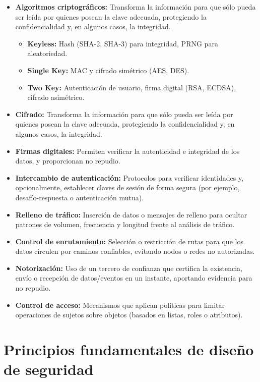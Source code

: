 \documentclass[11pt,a4paper]{article}
\begin{document}
    \begin{itemize}
        \item \textbf{Algoritmos criptográficos:} Transforma la información para que sólo pueda ser leída por quienes posean la clave adecuada, protegiendo la confidencialidad y, en algunos casos, la integridad.
        \begin{itemize}
            \item \textbf{Keyless:} Hash (SHA-2, SHA-3) para integridad, PRNG para aleatoriedad.
            \item \textbf{Single Key:} MAC y cifrado simétrico (AES, DES).
            \item \textbf{Two Key:} Autenticación de usuario, firma digital (RSA, ECDSA), cifrado asimétrico.
        \end{itemize}

        \item \textbf{Cifrado:} Transforma la información para que sólo pueda ser leída por quienes posean la clave adecuada, protegiendo la confidencialidad y, en algunos casos, la integridad.
        \item \textbf{Firmas digitales:} Permiten verificar la autenticidad e integridad de los datos, y proporcionan no repudio.
        \item \textbf{Intercambio de autenticación:} Protocolos para verificar identidades y, opcionalmente, establecer claves de sesión de forma segura (por ejemplo, desafío-respuesta o autenticación mutua).
        \item \textbf{Relleno de tráfico:} Inserción de datos o mensajes de relleno para ocultar patrones de volumen, frecuencia y longitud frente al análisis de tráfico.
        \item \textbf{Control de enrutamiento:} Selección o restricción de rutas para que los datos circulen por caminos confiables, evitando nodos o redes no autorizadas.
        \item \textbf{Notorización:} Uso de un tercero de confianza que certifica la existencia, envío o recepción de datos/eventos en un instante, aportando evidencia para no repudio.
        \item \textbf{Control de acceso:} Mecanismos que aplican políticas para limitar operaciones de sujetos sobre objetos (basados en listas, roles o atributos).
    \end{itemize}
    \section{Principios fundamentales de diseño de seguridad}
\end{document}
